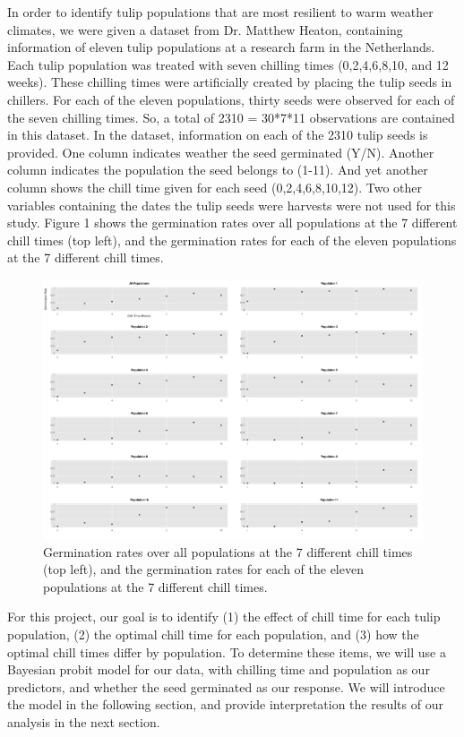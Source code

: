 \documentclass[mathserif]{article}
\def\beginmyfig{\begin{figure}[htbp]\begin{center}}
\def\endmyfig{\end{center}\end{figure}}
\begin{document}
\noindent
In order to identify tulip populations that are most resilient to warm weather
climates, we were given a dataset from Dr. Matthew Heaton, containing
information of eleven tulip populations at a research farm in the Netherlands.
Each tulip population was treated with seven chilling times (0,2,4,6,8,10, and
12 weeks). These chilling times were artificially created by placing the tulip
seeds in chillers. For each of the eleven populations, thirty seeds were
observed for each of the seven chilling times. So, a total of 2310 = 30*7*11
observations are contained in this dataset. In the dataset, information on each
of the 2310 tulip seeds is provided. One column indicates weather the seed
germinated (Y/N). Another column indicates the population the seed belongs to
(1-11). And yet another column shows the chill time given for each seed
(0,2,4,6,8,10,12). Two other variables containing the dates the tulip seeds
were harvests were not used for this study. Figure 1 shows the germination
rates over all populations at the 7 different chill times (top left), and
the germination rates for each of the eleven populations at the 7 different
chill times.\\
\beginmyfig
    \includegraphics[scale=.35]{../../images/rawData.pdf}
    \caption{Germination rates over all populations at the 7 different
             chill times (top left), and the germination rates for each of 
             the eleven populations at the 7 different chill times.}
\endmyfig

\noindent
For this project, our goal is to identify (1) the effect of chill time for each
tulip population, (2) the optimal chill time for each population, and (3) how
the optimal chill times differ by population. To determine these items, we will
use a Bayesian probit model for our data, with chilling time and population as
our predictors, and whether the seed germinated as our response. We will
introduce the model in the following section, and provide interpretation the
results of our analysis in the next section.\\
\end{document}
